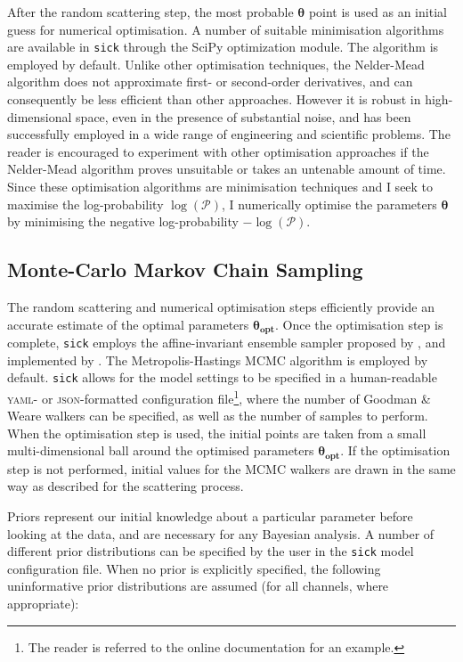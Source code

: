 \documentclass[iop]{emulateapj}
\newcommand{\sick}{\texttt{sick}}
\begin{document}
After the random scattering step, the most probable $\bm{\theta}$ point is used 
as an initial guess for numerical optimisation. A number of suitable minimisation 
algorithms are available in \sick{} through the SciPy \citep{scipy} optimization 
module. The \citet{nelder-mead} algorithm is employed by default.
Unlike other optimisation techniques, the Nelder-Mead algorithm 
does not approximate first- or second-order derivatives, and can consequently be 
less efficient than other approaches. However it is robust in high-dimensional 
space, even in the presence of substantial noise, and has been successfully 
employed in a wide range of engineering and scientific problems. The reader is 
encouraged to experiment with other optimisation approaches if the Nelder-Mead 
algorithm proves unsuitable or takes an untenable amount of time. Since these 
optimisation algorithms are minimisation techniques and I seek to maximise the 
log-probability $\log{\left(\mathcal{P}\right)}$, I numerically optimise the 
parameters $\bm{\theta}$ by minimising the negative log-probability 
$-\log{\left(\mathcal{P}\right)}$.

\subsection{Monte-Carlo Markov Chain Sampling}
\label{sec:mcmc}

The random scattering and numerical optimisation steps efficiently provide an 
accurate estimate of the optimal parameters $\bm{\theta_{opt}}$. Once the optimisation
 step is complete, \sick{} employs the affine-invariant ensemble sampler proposed 
 by \citet{goodman;weare}, and implemented by \citet{emcee}. The Metropolis-Hastings 
 MCMC algorithm is employed by default. \sick{} allows for the model settings to 
 be specified in a human-readable \textsc{yaml}- or \textsc{json}-formatted 
 configuration file\footnote{The reader is referred to the online documentation 
 for an example.}, where the number of Goodman \& Weare walkers can be specified, 
 as well as the number of samples to perform. When the optimisation step is used, 
 the initial points are taken from a small multi-dimensional ball around the 
 optimised parameters $\bm{\theta_{opt}}$. If the optimisation step is not 
 performed, initial values for the MCMC walkers are drawn in the same way as 
 described for the scattering process. 

Priors represent our initial knowledge about a particular parameter before 
looking at the data, and are necessary for any Bayesian analysis. A number of 
different prior distributions can be specified by the user in the \sick{} model 
configuration file. When no prior is explicitly specified, the following 
uninformative prior distributions are assumed (for all channels, where appropriate):
\end{document}
